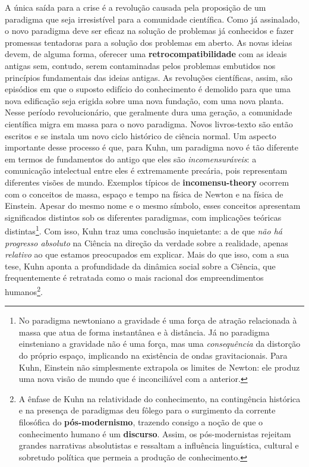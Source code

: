 \documentclass[./main.tex]{subfiles}
\begin{document}
\par A única saída para a crise é a revolução causada pela proposição de um \gls{paradigma} que seja irresistível para a comunidade científica. Como já assinalado, o novo \gls{paradigma} deve ser eficaz na solução de problemas já conhecidos e fazer promessas tentadoras para a solução dos problemas em aberto. As novas ideias devem, de alguma forma, oferecer uma \textbf{retrocompatibilidade} com as ideais antigas sem, contudo, serem contaminadas pelos problemas embutidos nos princípios fundamentais das ideias antigas. As revoluções científicas, assim, são episódios em que o suposto edifício do conhecimento é demolido para que uma nova edificação seja erigida sobre uma nova fundação, com uma nova planta. Nesse período revolucionário, que geralmente dura uma geração, a comunidade científica migra em massa para o novo \gls{paradigma}. Novos livros-texto são então escritos e se instala um novo ciclo histórico de ciência normal. Um aspecto importante desse processo é que, para Kuhn, um \gls{paradigma} novo é tão diferente em termos de fundamentos do antigo que eles são \textit{incomensuráveis}: a comunicação intelectual entre eles é extremamente precária, pois representam diferentes visões de mundo. Exemplos típicos de \textbf{\gls{incomensu-theory}} ocorrem com o conceitos de massa, espaço e tempo na física de Newton e na física de Einstein. Apesar do mesmo nome e o mesmo símbolo, esses conceitos apresentam significados distintos sob os diferentes paradigmas, com implicações teóricas distintas\footnote{No \gls{paradigma} newtoniano a gravidade é uma força de atração relacionada à massa que atua de forma instantânea e à distância. Já no \gls{paradigma} einsteniano a gravidade não é uma força, mas uma \textit{consequência} da distorção do próprio espaço, implicando na existência de ondas gravitacionais. Para Kuhn, Einstein não simplesmente extrapola os limites de Newton: ele produz uma nova visão de mundo que é inconciliável com a anterior.}. Com isso, Kuhn traz uma conclusão inquietante: a de que \textit{não há progresso absoluto} na Ciência na direção da verdade sobre a realidade, apenas \textit{relativo} ao que estamos preocupados em explicar. Mais do que isso, com a sua tese, Kuhn aponta a profundidade da dinâmica social sobre a Ciência, que frequentemente é retratada como o mais racional dos empreendimentos humanos\footnote{A ênfase de Kuhn na relatividade do conhecimento, na contingência histórica e na presença de paradigmas deu fôlego para o surgimento da corrente filosófica do \textbf{pós-modernismo}, trazendo consigo a noção de que o conhecimento humano é um \textbf{discurso}. Assim, os pós-modernistas rejeitam grandes narrativas absolutistas e ressaltam a influência linguística, cultural e sobretudo política que permeia a produção de conhecimento.}.
\end{document}
